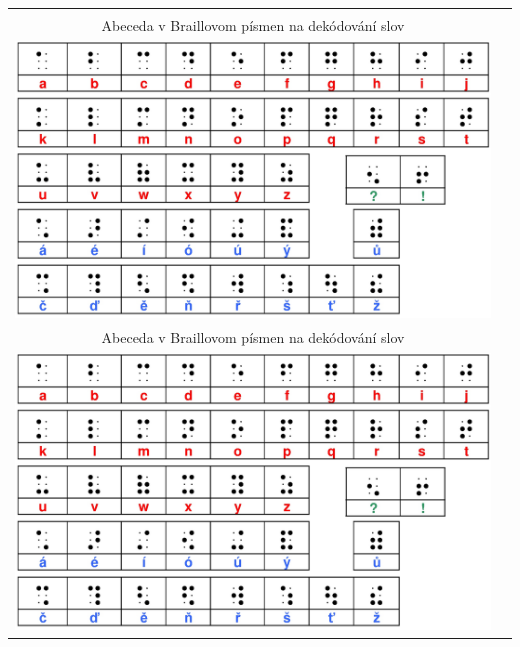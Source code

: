 \documentclass[10pt]{report}
\begin{document}
\begin{tabular}{c c}
\begin{minipage}{0.47\textwidth}
\begin{center}
\phantom{x}\\[10mm]
{\Large Abeceda v Braillovom písmen na dekódování slov}\\[1mm]
\includegraphics[width=\textwidth]{../images/brailleSkratene.png}
\end{center}
\end{minipage}
&
\begin{minipage}{0.47\textwidth}
\begin{center}
\phantom{x}\\[10mm]
{\Large Abeceda v Braillovom písmen na dekódování slov}\\[1mm]
\includegraphics[width=\textwidth]{../images/brailleSkratene.png}
\end{center}
\end{minipage}

\end{tabular}
\clearpage
\setlength{\tabcolsep}{4mm}
\end{document}
